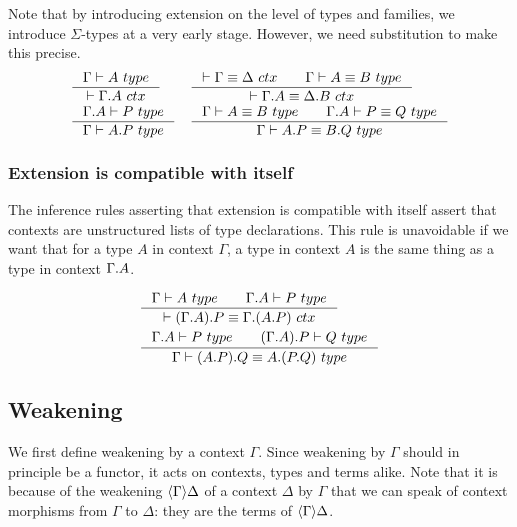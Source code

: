 Note that by introducing extension on the level of types and families,
we introduce $\Sigma$-types at a very early stage.
However, we need substitution to make this precise.
\begin{align}
& \inference{\jtype{\Gamma}{A}}{\jctx{\ctxext{\Gamma}{A}}}
& & \inference{\jctxeq{\Gamma}{\Delta}\qquad\jtypeeq{\Gamma}{A}{B}}{\jctxeq{\ctxext{\Gamma}{A}}{\ctxext{\Delta}{B}}}\\
& \inference{\jtype{\ctxext{\Gamma}{A}}{P}}{\jtype{\Gamma}{\ctxext{A}{P}}}
& & \inference{\jtypeeq{\Gamma}{A}{B}\qquad\jtypeeq{\ctxext{\Gamma}{A}}{P}{Q}}{\jtypeeq{\Gamma}{\ctxext{A}{P}}{\ctxext{B}{Q}}}
\end{align}

\subsubsection{Extension is compatible with itself}
The inference rules asserting that extension is compatible with itself assert
that contexts are unstructured lists of type declarations. This rule is
unavoidable if we want that for a type $A$ in context $\Gamma$, a type
in context $A$ is the same thing as a type in context $\ctxext{\Gamma}{A}$. 

\begin{align}
& \inference{\jtype{\Gamma}{A}\qquad\jtype{\ctxext{\Gamma}{A}}{P}}
  {\jctxeq{\ctxext{{\Gamma}{A}}{P}}{\ctxext{\Gamma}{{A}{P}}}}\\
& \inference{\jtype{\ctxext{\Gamma}{A}}{P}\qquad\jtype{\ctxext{{\Gamma}{A}}{P}}{Q}}
  {\jtypeeq{\Gamma}{\ctxext{{A}{P}}{Q}}{\ctxext{A}{{P}{Q}}}}
\end{align}

\subsection{Weakening}
We first define weakening by a context $\Gamma$. Since weakening by $\Gamma$
should in principle be a functor, it acts on contexts, types and terms alike.
Note that it is because of the weakening $\ctxwk{\Gamma}{\Delta}$ of a context
$\Delta$ by $\Gamma$ that we can speak of context morphisms from $\Gamma$ to $\Delta$: they are the terms
of $\ctxwk{\Gamma}{\Delta}$.

